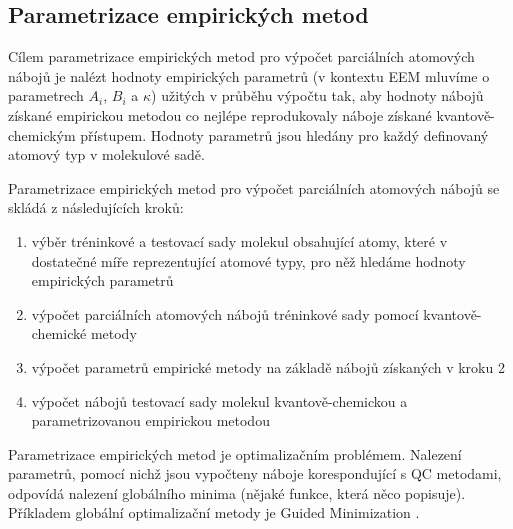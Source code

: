 \subsection{Parametrizace empirických metod}
\label{param}
Cílem parametrizace empirických metod pro výpočet parciálních atomových nábojů je nalézt hodnoty empirických parametrů (v kontextu EEM mluvíme o parametrech $A_i$, $B_i$ a $\kappa$) užitých v průběhu výpočtu tak, aby hodnoty nábojů získané empirickou metodou co nejlépe reprodukovaly náboje získané kvantově-chemickým přístupem. Hodnoty parametrů jsou hledány pro každý definovaný atomový typ v molekulové sadě.

Parametrizace empirických metod pro výpočet parciálních atomových nábojů se skládá z následujících kroků:

\begin{enumerate}
\itemsep0em
    \item výběr tréninkové a testovací sady molekul obsahující atomy, které v dostatečné míře reprezentující atomové typy, pro něž hledáme hodnoty empirických parametrů
    \item výpočet parciálních atomových nábojů tréninkové sady pomocí kvantově-chemi\-cké metody
    \item výpočet parametrů empirické metody na základě nábojů získaných v kroku 2
    \item výpočet nábojů testovací sady molekul kvantově-chemickou a parametrizovanou empirickou metodou
\end{enumerate}

Parametrizace empirických metod je optimalizačním problémem. Nalezení parametrů, pomocí nichž jsou vypočteny náboje korespondující s QC metodami, odpovídá nalezení globálního minima (nějaké funkce, která něco popisuje). Příkladem globální optimalizační metody je Guided Minimization \cite{guided_m}.

